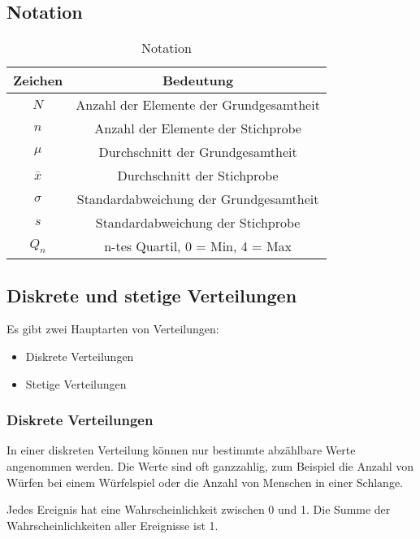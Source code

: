 \documentclass[12pt]{scrartcl}
\begin{document}
\subsection{Notation}

\begin{table}[h]
    \begin{tabular}{ | c | c | }
        \hline
        Zeichen   & Bedeutung                               \\
        \hline
        \hline
        $N$       & Anzahl der Elemente der Grundgesamtheit \\
        $n$       & Anzahl der Elemente der Stichprobe      \\
        $\mu$     & Durchschnitt der Grundgesamtheit        \\
        $\bar{x}$ & Durchschnitt der Stichprobe             \\
        $\sigma$  & Standardabweichung der Grundgesamtheit  \\
        $s$       & Standardabweichung der Stichprobe       \\
        $Q_n$     & n-tes Quartil, 0 = Min, 4 = Max         \\
        \hline
    \end{tabular}
    \caption{Notation}
\end{table}

\pagebreak

\subsection{Diskrete und stetige Verteilungen}

Es gibt zwei Hauptarten von Verteilungen:
\begin{itemize}
    \item Diskrete Verteilungen
    \item Stetige Verteilungen
\end{itemize}

\subsubsection{Diskrete Verteilungen}

In einer diskreten Verteilung können nur bestimmte abzählbare Werte angenommen werden.
Die Werte sind oft ganzzahlig, zum Beispiel die Anzahl von Würfen bei einem Würfelspiel oder die Anzahl von Menschen in einer Schlange.\par

Jedes Ereignis hat eine Wahrscheinlichkeit zwischen 0 und 1.
Die Summe der Wahrscheinlichkeiten aller Ereignisse ist 1.\par
\end{document}
